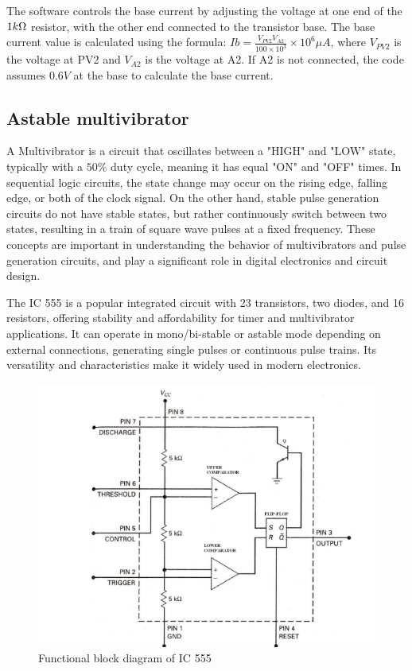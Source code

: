 		The software controls the base current by adjusting the voltage at one end of the $1k\ohm$ resistor, with the other end connected to the transistor base. The base current value is calculated using the formula: $Ib = \frac{V_{PV2}V_{A2}}{100 \times 10^3} \times 10^6 \mu A$, where $V_{PV2}$ is the voltage at PV2 and $V_{A2}$ is the voltage at A2. If A2 is not connected, the code assumes $0.6 V$ at the base to calculate the base current.
	\subsection{Astable multivibrator}
		A Multivibrator is a circuit that oscillates between a "HIGH" and "LOW" state, typically with a $50\%$ duty cycle, meaning it has equal "ON" and "OFF" times. In sequential logic circuits, the state change may occur on the rising edge, falling edge, or both of the clock signal. On the other hand, stable pulse generation circuits do not have stable states, but rather continuously switch between two states, resulting in a train of square wave pulses at a fixed frequency. These concepts are important in understanding the behavior of multivibrators and pulse generation circuits, and play a significant role in digital electronics and circuit design.
		
		The IC 555 is a popular integrated circuit with 23 transistors, two diodes, and 16 resistors, offering stability and affordability for timer and multivibrator applications. It can operate in mono/bi-stable or astable mode depending on external connections, generating single pulses or continuous pulse trains. Its versatility and characteristics make it widely used in modern electronics.

		\begin{figure}[h]
			\centering
			\includegraphics[width=0.8\columnwidth]{images/e3.png}
			\caption{Functional block diagram of IC 555}
			\label{th:3}
		\end{figure}

